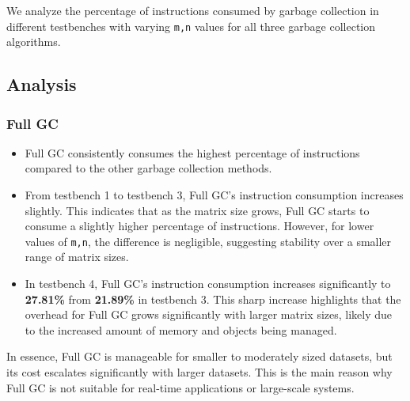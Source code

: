 \documentclass[10pt]{article}
\begin{document}
We analyze the percentage of instructions consumed by garbage collection in different testbenches with varying \texttt{m,n} values for all three garbage collection algorithms.

\subsection{Analysis}
\subsubsection{Full GC}
\begin{itemize}
    \item Full GC consistently consumes the highest percentage of instructions compared to the other garbage collection methods.
    \item From testbench 1 to testbench 3, Full GC's instruction consumption increases slightly. This indicates that as the matrix size grows, Full GC starts to consume a slightly higher percentage of instructions. However, for lower values of \texttt{m,n}, the difference is negligible, suggesting stability over a smaller range of matrix sizes.
    \item In testbench 4, Full GC's instruction consumption increases significantly to \textbf{27.81\%} from \textbf{21.89\%} in testbench 3. This sharp increase highlights that the overhead for Full GC grows significantly with larger matrix sizes, likely due to the increased amount of memory and objects being managed.
\end{itemize}
In essence, Full GC is manageable for smaller to moderately sized datasets, but its cost escalates significantly with larger datasets. This is the main reason why Full GC is not suitable for real-time applications or large-scale systems.
\end{document}
